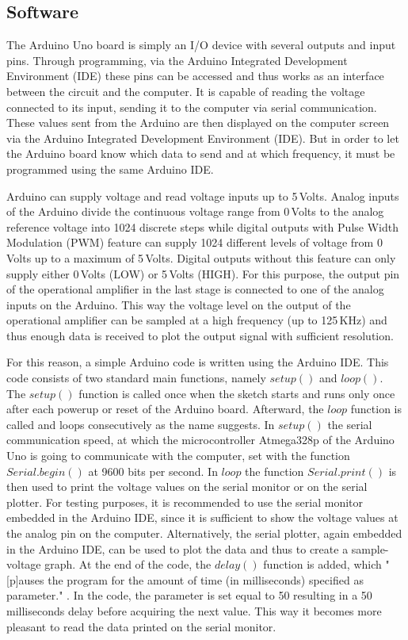 \subsection{Software}
The Arduino Uno board is simply an I/O device with several outputs and input pins. Through programming, via the Arduino Integrated Development Environment (IDE) these pins can be accessed and thus works as an interface between the circuit and the computer. It is capable of reading the voltage connected to its input, sending it to the computer via serial communication. These values sent from the Arduino are then displayed on the computer screen via the Arduino Integrated Development Environment (IDE). But in order to let the Arduino board know which data to send and at which frequency, it must be programmed using the same Arduino IDE.\par
Arduino can supply voltage and read voltage inputs up to 5\,Volts. Analog inputs of the Arduino divide the continuous voltage range from 0\,Volts to the analog reference voltage into 1024 discrete steps while digital outputs with Pulse Width Modulation (PWM) feature can supply 1024 different levels of voltage from 0\,Volts up to a maximum of 5\,Volts. Digital outputs without this feature can only supply either 0\,Volts (LOW) or 5\,Volts (HIGH). For this purpose, the output pin of the operational amplifier in the last stage is connected to one of the analog inputs on the Arduino. This way the voltage level on the output of the operational amplifier can be sampled at a high frequency (up to 125\,KHz) and thus enough data is received to plot the output signal with sufficient resolution. \par
For this reason, a simple Arduino code is written using the Arduino IDE. This code consists of two standard main functions, namely $setup()$ and $loop()$. The $setup()$ function is called once when the sketch starts and runs only once after each powerup or reset of the Arduino board. Afterward, the $loop$ function is called and loops consecutively as the name suggests. In $setup()$ the serial communication speed, at which the microcontroller Atmega328p of the Arduino Uno is going to communicate with the computer, set with the function $Serial.begin()$ at 9600 bits per second. In $loop$ the function $Serial.print()$ is then used to print the voltage values on the serial monitor or on the serial plotter. For testing purposes, it is recommended to use the serial monitor embedded in the Arduino IDE, since it is sufficient to show the voltage values at the analog pin on the computer. Alternatively, the serial plotter, again embedded in the Arduino IDE, can be used to plot the data and thus to create a sample-voltage graph. At the end of the code, the $delay()$ function is added, which "[p]auses the program for the amount of time (in milliseconds) specified as parameter." \cite{delay}. In the code, the parameter is set equal to 50 resulting in a 50 milliseconds delay before acquiring the next value. This way it becomes more pleasant to read the data printed on the serial monitor.

